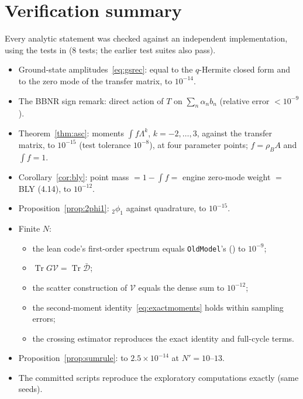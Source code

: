 \documentclass[11pt]{article}
\newcommand{\Tr}{\operatorname{Tr}}
\newcommand{\Np}{N'}
\newcommand{\Dbar}{\bar{\mathcal D}}
\newcommand{\Vc}{\mathcal V}
\theoremstyle{plain}
\theoremstyle{remark}
\numberwithin{equation}{section}
\begin{document}
\appendix

\section{Verification summary}\label{app:verify}

Every analytic statement was checked against an independent implementation, using the tests in
 (8 tests; the earlier test suites also pass).
\begin{itemize}\itemsep1pt
\item Ground-state amplitudes~\eqref{eq:gsrec}: equal to the $q$-Hermite closed form and to the zero mode of the
  transfer matrix, to $10^{-14}$.
\item The BBNR sign remark: direct action of $T$ on $\sum_n\alpha_n b_n$ (relative error $<10^{-9}$).
\item Theorem~\ref{thm:asc}: moments $\int f\Lambda^k$, $k=-2,\dots,3$, against the transfer matrix, to $10^{-15}$
  (test tolerance $10^{-8}$), at four parameter points; $f=\rho_BA$ and $\int f=1$.
\item Corollary~\ref{cor:bly}: point mass $=1-\int f=$ engine zero-mode weight $=$ BLY (4.14), to $10^{-12}$.
\item Proposition~\ref{prop:2phi1}: ${}_2\phi_1$ against quadrature, to $10^{-15}$.
\item Finite $N$:
  \begin{itemize}\itemsep0pt
  \item the lean code's first-order spectrum equals \texttt{OldModel}'s () to $10^{-9}$;
  \item $\Tr G\Vc=\Tr\Dbar$;
  \item the scatter construction of $\Vc$ equals the dense sum to $10^{-12}$;
  \item the second-moment identity~\eqref{eq:exactmoments} holds within sampling errors;
  \item the crossing estimator reproduces the exact identity and full-cycle terms.
  \end{itemize}
\item Proposition~\ref{prop:sumrule}: to $2.5\times10^{-14}$ at $\Np=10$--$13$.
\item The committed scripts reproduce the exploratory computations exactly (same seeds).
\end{itemize}
\end{document}
